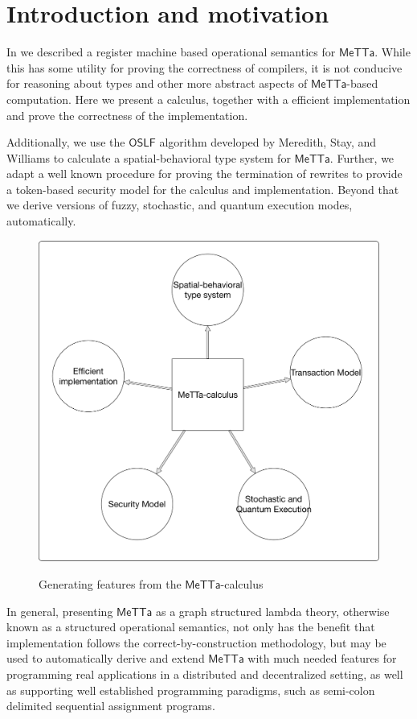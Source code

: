 \section{Introduction and motivation}

In \cite{arxiv:meta-metta-opsem:meredith} we described a register
machine based operational semantics for $\mathsf{MeTTa}$. While this
has some utility for proving the correctness of compilers, it is not
conducive for reasoning about types and other more abstract aspects of
$\mathsf{MeTTa}$-based computation. Here we present a calculus,
together with a efficient implementation and prove the correctness of
the implementation.

Additionally, we use the $\mathsf{OSLF}$ algorithm developed by
Meredith, Stay, and Williams to calculate a spatial-behavioral type
system for $\mathsf{MeTTa}$. Further, we adapt a well known procedure
for proving the termination of rewrites to provide a token-based
security model for the calculus and implementation. Beyond that we
derive versions of fuzzy, stochastic, and quantum execution modes,
automatically.

\begin{figure}
  \centering
  \includegraphics[scale=0.25]{MeTTaCalculusGenerationOfFeatures.pdf} \\
  \caption{Generating features from the $\mathsf{MeTTa}$-calculus}
\end{figure}

In general, presenting $\mathsf{MeTTa}$ as a graph structured lambda
theory, otherwise known as a structured operational semantics, not
only has the benefit that implementation follows the
correct-by-construction methodology, but may be used to automatically
derive and extend $\mathsf{MeTTa}$ with much needed features for
programming real applications in a distributed and decentralized
setting, as well as supporting well established programming paradigms,
such as semi-colon delimited sequential assignment programs.
